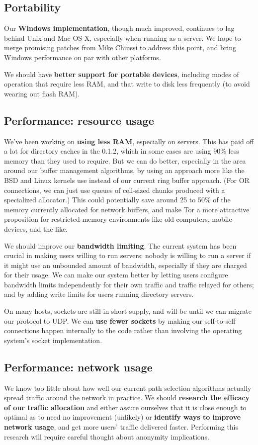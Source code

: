 \documentclass{article}
\begin{document}
\subsection{Portability}
Our {\bf Windows implementation}, though much improved, continues to lag
behind Unix and Mac OS X, especially when running as a server.  We hope to
merge promising patches from Mike Chiussi to address this point, and bring
Windows performance on par with other platforms.

We should have {\bf better support for portable devices}, including modes of
operation that require less RAM, and that write to disk less frequently (to
avoid wearing out flash RAM).

\subsection{Performance: resource usage}
We've been working on {\bf using less RAM}, especially on servers.  This has
paid off a lot for directory caches in the 0.1.2, which in some cases are
using 90\% less memory than they used to require.  But we can do better,
especially in the area around our buffer management algorithms, by using an
approach more like the BSD and Linux kernels use instead of our current ring
buffer approach.  (For OR connections, we can just use queues of cell-sized
chunks produced with a specialized allocator.)  This could potentially save
around 25 to 50\% of the memory currently allocated for network buffers, and
make Tor a more attractive proposition for restricted-memory environments
like old computers, mobile devices, and the like.

We should improve our {\bf bandwidth limiting}.  The current system has been
crucial in making users willing to run servers: nobody is willing to run a
server if it might use an unbounded amount of bandwidth, especially if they
are charged for their usage.  We can make our system better by letting users
configure bandwidth limits independently for their own traffic and traffic
relayed for others; and by adding write limits for users running directory
servers.

On many hosts, sockets are still in short supply, and will be until we can
migrate our protocol to UDP.  We can {\bf use fewer sockets} by making our
self-to-self connections happen internally to the code rather than involving
the operating system's socket implementation.

\subsection{Performance: network usage}
We know too little about how well our current path
selection algorithms actually spread traffic around the network in practice.
We should {\bf research the efficacy of our traffic allocation} and either
assure ourselves that it is close enough to optimal as to need no improvement
(unlikely) or {\bf identify ways to improve network usage}, and get more
users' traffic delivered faster.  Performing this research will require
careful thought about anonymity implications.
\end{document}
